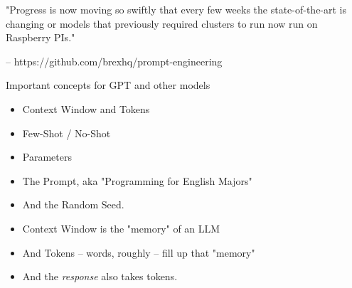 \documentclass{beamer}
\begin{document}
\begin{frame}[plain]
\end{frame}

\begin{frame}
	"Progress is now moving so swiftly that every few weeks the state-of-the-art is changing or models that previously required clusters to run now run on Raspberry PIs."
	 
	 -- https://github.com/brexhq/prompt-engineering
\end{frame}

\begin{frame}{Important concepts for GPT and other models}
	\begin{itemize}
		\item Context Window and Tokens
		\pause
		\item Few-Shot / No-Shot
		\pause
		\item Parameters
		\pause
		\item The Prompt, aka "Programming for English Majors"
		\pause
		\item And the Random Seed.
	\end{itemize}
\end{frame}

\begin{frame}
	\begin{itemize}
		\item Context Window is the "memory" of an LLM
		\pause
		\item And Tokens -- words, roughly -- fill up that "memory"
		\pause
		\item And the \textit{response} also takes tokens.
	\end{itemize}
\end{frame}
\end{document}
